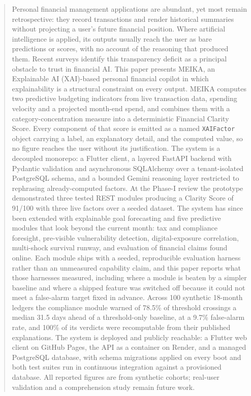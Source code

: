 \documentclass[conference]{IEEEtran}
\begin{document}
\begin{abstract}
Personal financial management applications are abundant, yet most remain retrospective: they record transactions and render historical summaries without projecting a user's future financial position. Where artificial intelligence is applied, its outputs usually reach the user as bare predictions or scores, with no account of the reasoning that produced them. Recent surveys identify this transparency deficit as a principal obstacle to trust in financial AI. This paper presents MEIKA, an Explainable AI (XAI)-based personal financial copilot in which explainability is a structural constraint on every output. MEIKA computes two predictive budgeting indicators from live transaction data, spending velocity and a projected month-end spend, and combines them with a category-concentration measure into a deterministic Financial Clarity Score. Every component of that score is emitted as a named \texttt{XAIFactor} object carrying a label, an explanatory detail, and the computed value, so no figure reaches the user without its justification. The system is a decoupled monorepo: a Flutter client, a layered FastAPI backend with Pydantic validation and asynchronous SQLAlchemy over a tenant-isolated PostgreSQL schema, and a bounded Gemini reasoning layer restricted to rephrasing already-computed factors. At the Phase-I review the prototype demonstrated three tested REST modules producing a Clarity Score of 91/100 with three live factors over a seeded dataset. The system has since been extended with explainable goal forecasting and five predictive modules that look beyond the current month: tax and compliance foresight, pre-visible vulnerability detection, digital-exposure correlation, multi-shock survival runway, and evaluation of financial claims found online. Each module ships with a seeded, reproducible evaluation harness rather than an unmeasured capability claim, and this paper reports what those harnesses measured, including where a module is beaten by a simpler baseline and where a shipped feature was switched off because it could not meet a false-alarm target fixed in advance. Across 100 synthetic 18-month ledgers the compliance module warned of 78.5\% of threshold crossings a median 31.5 days ahead of a threshold-only baseline, at a 9.7\% false-alarm rate, and 100\% of its verdicts were recomputable from their published explanations. The system is deployed and publicly reachable: a Flutter web client on GitHub Pages, the API as a container on Render, and a managed PostgreSQL database, with schema migrations applied on every boot and both test suites run in continuous integration against a provisioned database. All reported figures are from synthetic cohorts; real-user validation and a comprehension study remain future work.
\end{abstract}
\end{document}
